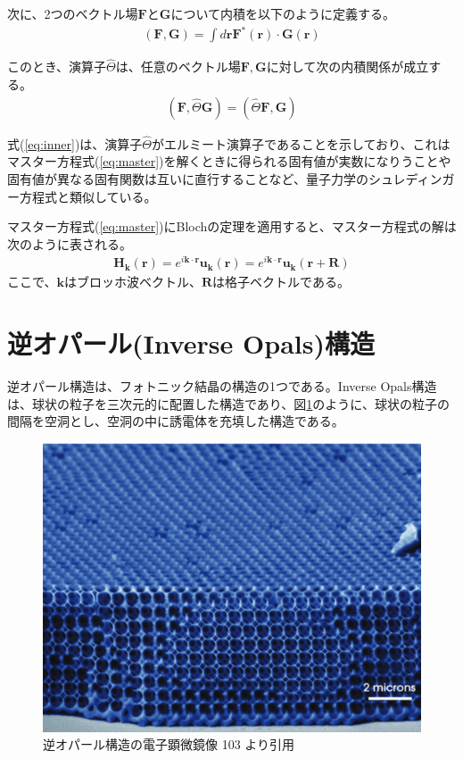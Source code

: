 \documentclass[platex,dvipdfmx,draft]{jsreport}
\numberwithin{equation}{section}
\begin{document}
次に、2つのベクトル場$\bm{F}$と$\bm{G}$について内積を以下のように定義する。
\begin{align}
  (\bm{F}, \bm{G}) = \int d\bm{r} \bm{F}^*(\bm{r}) \cdot \bm{G}(\bm{r})
\end{align}

このとき、演算子$\hat{\Theta}$は、任意のベクトル場$\bm{F}, \bm{G}$に対して次の内積関係が成立する。
\begin{align}
  \label{eq:inner}
  (\bm{F}, \hat{\Theta} \bm{G}) = (\hat{\Theta} \bm{F}, \bm{G})
\end{align}

式(\ref{eq:inner})は、演算子$\hat{\Theta}$がエルミート演算子であることを示しており、これはマスター方程式(\ref{eq:master})を解くときに得られる固有値が実数になりうことや固有値が異なる固有関数は互いに直行することなど、量子力学のシュレディンガー方程式と類似している。

マスター方程式(\ref{eq:master})にBlochの定理を適用すると、マスター方程式の解は次のように表される。
\begin{align}
  \bm{H}_{\bm{k}}(\bm{r}) = e^{i \bm{k} \cdot \bm{r}} \bm{u}_{\bm{k}}(\bm{r}) = e^{i \bm{k} \cdot \bm{r}} \bm{u}_{\bm{k}}(\bm{r + R})
\end{align}
ここで、$\bm{k}$はブロッホ波ベクトル、$\bm{R}$は格子ベクトルである。

\section{逆オパール(Inverse Opals)構造}
逆オパール構造は、フォトニック結晶の構造の1つである。Inverse Opals構造は、球状の粒子を三次元的に配置した構造であり、図\ref{fig:inverse_opals}のように、球状の粒子の間隔を空洞とし、空洞の中に誘電体を充填した構造である。
\begin{figure}[htbp]
  \centering
  \includegraphics[width=0.6\linewidth]{inv_opals.png}
  \caption{逆オパール構造の電子顕微鏡像 \cite{text}103 より引用}
  \label{fig:inverse_opals}

\end{figure}
\end{document}
